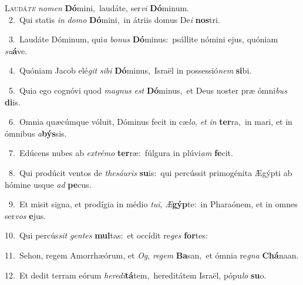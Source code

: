 \lettrine{\initial\textcolor{\initialcolor}{L}}{audá\-\textit{te}\-} \textit{no}\-\textit{men} \textbf{Dó}\-mini,~\star laudáte, ser\textit{vi} \textbf{Dó}\-minum.\\
{\numbfont\textcolor{\numbcolor}{~2.}}~Qui statis \textit{in} \textit{do}\-\textit{mo} \textbf{Dó}\-mini,~\star in átriis domus De\textit{i} \textbf{nos}\-tri.\par
{\numbfont\textcolor{\numbcolor}{~3.}}~Laudáte Dóminum, qui\textit{a} \textit{bo}\-\textit{nus} \textbf{Dó}\-minus:~\star psállite nómini ejus, quóniam \textit{su}\-\textbf{á}ve.\par
{\numbfont\textcolor{\numbcolor}{~4.}}~Quóniam Jacob elé\textit{git} \textit{si}\-\textit{bi} \textbf{Dó}\-minus,~\star Israël in possessió\textit{nem} \textbf{si}\-bi.\par
{\numbfont\textcolor{\numbcolor}{~5.}}~Quia ego cognóvi quod \textit{ma}\-\textit{gnus} \textit{est} \textbf{Dó}\-minus,~\star et Deus noster præ ómni\textit{bus} \textbf{di}\-is.\par
{\numbfont\textcolor{\numbcolor}{~6.}}~Omnia quæcúmque vóluit, Dóminus fecit in cæ\-\textit{lo}\-, \textit{et} \textit{in} \textbf{ter}\-ra,~\star in mari, et in ómnibus \textit{a}\-\textbf{býs}sis.\par
{\numbfont\textcolor{\numbcolor}{~7.}}~Edúcens nubes ab \textit{ex}\-\textit{tré}\textit{mo} \textbf{ter}\-ræ:~\star fúlgura in plúvi\textit{am} \textbf{fe}\-cit.\par
{\numbfont\textcolor{\numbcolor}{~8.}}~Qui prodúcit ventos de \textit{the}\-\textit{sáu}\textit{ris} \textbf{su}\-is:~\star qui percússit primogénita Ægýpti ab hómine usque \textit{ad} \textbf{pe}\-cus.\par
{\numbfont\textcolor{\numbcolor}{~9.}}~Et misit signa, et prodígia in médio \textit{tu}\-\textit{i}, \textit{Æ}\-\textbf{gýp}te:~\star in Pharaónem, et in omnes ser\textit{vos} \textbf{e}\-jus.\par
{\numbfont\textcolor{\numbcolor}{10.}}~Qui percús\textit{sit} \textit{gen}\-\textit{tes} \textbf{mul}\-tas:~\star et occídit re\textit{ges} \textbf{for}\-tes:\par
{\numbfont\textcolor{\numbcolor}{11.}}~Sehon, regem Amorrhæórum, et \textit{Og}\-, \textit{re}\-\textit{gem} \textbf{Ba}\-san,~\star et ómnia re\textit{gna} \textbf{Chá}\-naan.\par
{\numbfont\textcolor{\numbcolor}{12.}}~Et dedit terram eórum \textit{he}\-\textit{re}\textit{di}\textbf{tá}tem,~\star hereditátem Israël, pópu\textit{lo} \textbf{su}\-o.\par
